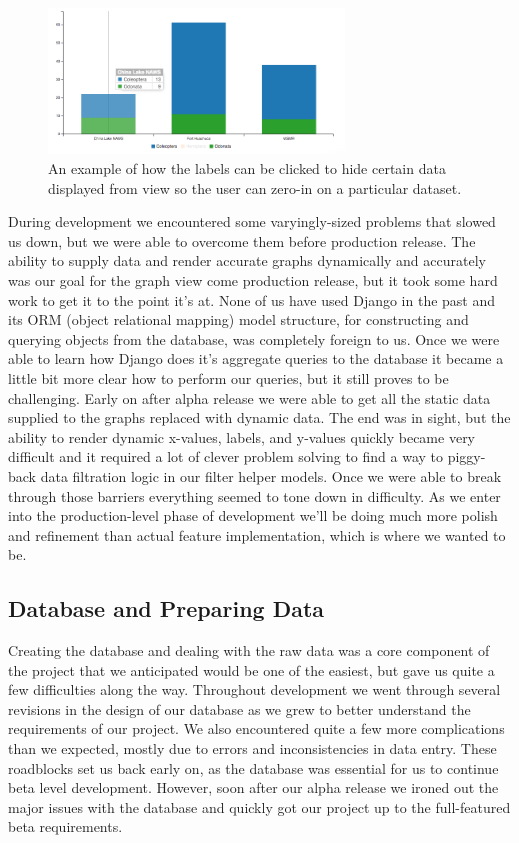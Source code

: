 \documentclass[10pt,draftclsnofoot,onecolumn]{IEEEtran}
\begin{document}
\begin{figure}[h]
\centering
\includegraphics[width=0.70\textwidth]{images/bar_chart_collapsed.png}
\captionsetup{justification=centering}
\caption{
  An example of how the labels can be clicked to hide certain data displayed from view so the user can zero-in on a particular dataset.
}
\label{fig:bar_chart_collapsed}
\end{figure}

During development we encountered some varyingly-sized problems that slowed us down, but we were able to overcome them before production release.
The ability to supply data and render accurate graphs dynamically and accurately was our goal for the graph view come production release, but it took some hard work to get it to the point it's at.
None of us have used Django in the past and its ORM (object relational mapping) model structure, for constructing and querying objects from the database, was completely foreign to us.
Once we were able to learn how Django does it’s aggregate queries to the database it became a little bit more clear how to perform our queries, but it still proves to be challenging.
Early on after alpha release we were able to get all the static data supplied to the graphs replaced with dynamic data.
The end was in sight, but the ability to render dynamic x-values, labels, and y-values quickly became very difficult and it required a lot of clever problem solving to find a way to piggy-back data filtration logic in our filter helper models.
Once we were able to break through those barriers everything seemed to tone down in difficulty.
As we enter into the production-level phase of development we'll be doing much more polish and refinement than actual feature implementation, which is where we wanted to be.

\subsection{Database and Preparing Data} %

Creating the database and dealing with the raw data was a core component of the project that we anticipated would be one of the easiest, but gave us quite a few difficulties along the way.
Throughout development we went through several revisions in the design of our database as we grew to better understand the requirements of our project.
We also encountered quite a few more complications than we expected, mostly due to errors and inconsistencies in data entry.
These roadblocks set us back early on, as the database was essential for us to continue beta level development.
However, soon after our alpha release we ironed out the major issues with the database and quickly got our project up to the full-featured beta requirements.
\end{document}
